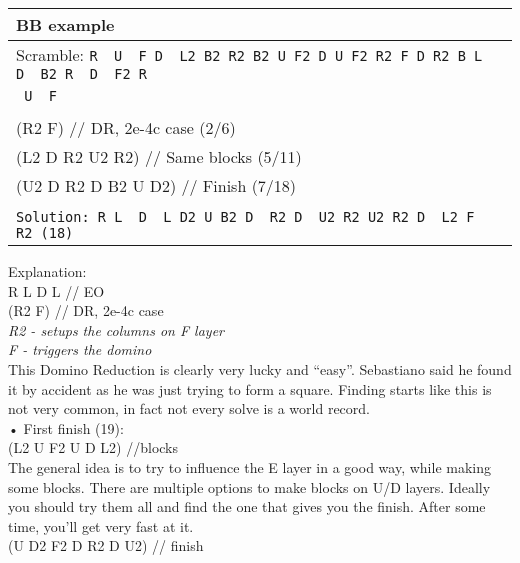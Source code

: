\documentclass[11pt,a4paper]{book}
\newcommand{\p}{\textquotesingle}
\newcommand{\m}{\texttt}
\newcommand{\ps}{\p\,\,}
\newcommand{\comment}[1]{{\color{gray}\quad//#1}}
\begin{document}
\bigskip
\begin{tabular}{|l|}
\hline
\textbf{BB example }\\
\hline
Scramble: \m{R\ps U\ps F D\ps L2 B2 R2 B2 U F2 D U F2 R2 F D R2 B L D\ps B2 R\ps D\ps F2 R\ps}\\ \m{ U\ps F}\\
\hline
\begin{minipage}[l]{0.650\textwidth}
\bigskip
\m{R L\ps D\ps L \comment{ EO (4/4)}\\
(R2 F) \comment{ DR, 2e-4c case (2/6) }\\
(L2 D R2 U2 R2)  \comment{ Same blocks (5/11) }\\
(U2 D R2 D B2 U\ps D2)  \comment{ Finish (7/18) }\\
}
\bigskip
\end{minipage}
\begin{minipage}[c]{0.25\textwidth}
\centering
\def\svgwidth{\columnwidth}

\end{minipage}\\
\hline
\m{Solution: R L\ps D\ps L D2 U B2 D\ps R2 D\ps U2 R2 U2 R2 D\ps L2 F\ps R2 (18)}\\
\hline
\end{tabular}
\bigskip
\newline
Explanation:\\
R L\ps D\ps L \comment{ EO }\\
(R2 F) \comment{ DR, 2e-4c case}\\
\textit{ R2 - setups the columns on F layer}\\
\textit{ F - triggers the domino}\\
\newline
This Domino Reduction is clearly very lucky and “easy”. Sebastiano said he found it by accident as he was just trying to form a square. Finding starts like this is not very common, in fact not every solve is a world record.\\
\newline
• First finish (19):\\
(L2 U F2 U\ps D\ps L2)  \comment{blocks }\\
The general idea is to try to influence the E layer in a good way, while making some blocks. There are multiple options to make blocks on U/D layers. Ideally you should try them all and find the one that gives you the finish. After some time, you’ll get very fast at it.\\
\newline
(U D2 F2 D R2 D\ps U2)  \comment{ finish }\\
\end{document}
